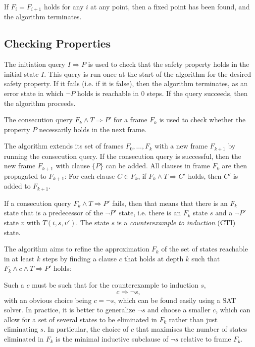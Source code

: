 \documentclass[12pt,a4paper,twoside,openright]{report}
\begin{document}
If $F_i = F_{i + 1}$ holds for any $i$ at any point, then a fixed point has
been found, and the algorithm terminates.

\subsection{Checking Properties}
The initiation query $I \Rightarrow P$ is used to check that the safety
property holds in the initial state $I$.
This query is run once at the start of
the algorithm for the desired safety property. If it fails (i.e. if it
is false), then the algorithm terminates, as an error state in
which $\neg P$ holds is reachable in 0 steps. If the query succeeds,
then the algorithm proceeds.

The consecution query $F_k \wedge T \Rightarrow P'$ for a frame $F_k$
is used to check whether the property $P$ necessarily holds in the next
frame.

The algorithm extends its set of frames $F_0,\ldots,F_k$ with a new frame
$F_{k + 1}$ by running the consecution query.
If the consecution query is successful, then the new frame $F_{k + 1}$
with clause $\{P\}$ can be added.
All clauses in frame $F_k$ are then propagated to $F_{k + 1}$:
For each clause $C \in F_k$, if $F_k \wedge T \Rightarrow C'$ holds, then $C'$
is added to $F_{k + 1}$.

If a consecution query $F_k \wedge T \Rightarrow P'$ fails, then that means that
there is an $F_k$ state that is a predecessor of the $\neg P'$ state,
i.e. there is an $F_k$ state $s$ and a $\neg P'$ state $v$ with $T(i,s,v')$.
The state
$s$ is a \emph{counterexample to induction} (CTI) state.

The algorithm aims to refine the approximation $F_k$ of the set of states
reachable in at least $k$ steps
by finding a clause $c$ that holds at depth $k$ such that
$F_k \wedge c \wedge T \Rightarrow P'$ holds:

Such a $c$ must be such that for the counterexample to induction $s$,
$$c \Rightarrow \neg s,$$
with an obvious choice being $c = \neg s$, which can be found easily using
a SAT solver. In practice, it is better to generalize $\neg s$ and choose
a smaller $c$,
which can allow for a set of several states to be eliminated in $F_k$
rather than just eliminating $s$. In particular, the choice of $c$ that
maximises the number of states eliminated in $F_k$ is the minimal
inductive subclause of $\neg s$ relative to frame $F_k$.
\end{document}
